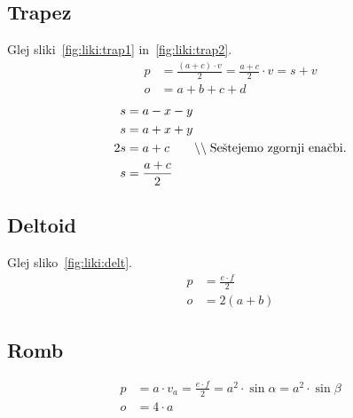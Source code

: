 \documentclass[a4paper,oneside,12pt,fleqn]{article}
\newcommand\krat\cdot
\newcommand{\comment}[1]{\ensuremath{\qquad\backslash\backslash\;}\textnormal{#1}}
\numberwithin{equation}{section}
\begin{document}
\parbox[t]{0.5\textwidth}{
\subsection{Trapez}
\label{sec:liki:trap}
Glej sliki~\ref{fig:liki:trap1} in~\ref{fig:liki:trap2}.
\begin{align*}
  p &=  \frac{(a+c)\krat v}{2} = \frac{a+c}{2} \krat v = s + v \\ 
  o &=  a + b + c + d 
\end{align*}
\begin{align*}
  s &=  a - x - y \\
  s &=  a + x + y \\
   2s &=  a+c \comment{Seštejemo zgornji enačbi.}\\
  s &= \frac{a+c}{2}
\end{align*}

\subsection{Deltoid}
\label{sec:liki:delt}
Glej sliko~\ref{fig:liki:delt}.
\begin{align*}
  p &= \frac{e\krat f}{2} \\
  o &= 2(a+b)
\end{align*}

\subsection{Romb}
\label{sec:liki:romb}
\begin{align*}
  p &=  a\krat v_a = \frac{e\krat f}{2} = a^2\krat\sin\alpha = a^2\krat\sin\beta \\
  o &=  4\krat a 
\end{align*}
}
\end{document}
